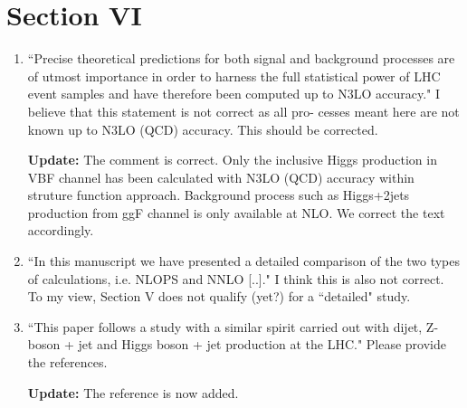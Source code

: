 \documentclass[12pt]{article}
\begin{document}
\section*{Section VI}
\begin{enumerate}
\item ``Precise theoretical predictions for both signal and background processes are of utmost importance in order to harness the full statistical power of LHC event samples and have therefore been computed up to N3LO accuracy." I believe that this statement is not correct as all pro- cesses meant here are not known up to N3LO (QCD) accuracy. This should be corrected.

{\bf Update:} The comment is correct. Only the inclusive Higgs production in VBF channel has been calculated with N3LO (QCD) accuracy within struture function approach. Background process such as Higgs+2jets production from ggF channel is only available at NLO. We correct the text accordingly. 

\item ``In this manuscript we have presented a detailed comparison of the two types of calculations, i.e. NLOPS and NNLO [..]." I think this is also not correct. To my view, Section V does not qualify (yet?) for a ``detailed" study.
\item ``This paper follows a study with a similar spirit carried out with dijet, Z-boson + jet and Higgs boson + jet production at the LHC." Please provide the references.

{\bf Update:} The reference is now added.
\end{enumerate}
\end{document}

